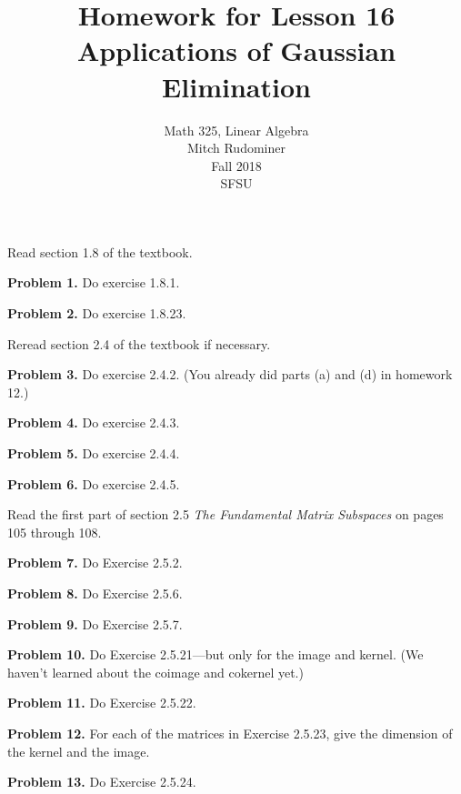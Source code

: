 \documentclass[oneside,12pt]{amsart}
\begin{document}
\title{Homework for Lesson 16 \\ Applications of Gaussian Elimination}
\author{Math 325, Linear Algebra \\ Mitch Rudominer \\ Fall 2018 \\ SFSU }
\date{}

\maketitle

\bigskip

Read section 1.8 of the textbook.

\bigskip

\textbf{Problem 1.} Do exercise 1.8.1.

\bigskip
\bigskip
\bigskip


\textbf{Problem 2.} Do exercise 1.8.23.

\bigskip
\bigskip
\bigskip

Reread section 2.4 of the textbook if necessary.

\bigskip

\textbf{Problem 3.} Do exercise 2.4.2. (You already did parts (a) and (d) in homework 12.)

\bigskip
\bigskip
\bigskip

\textbf{Problem 4.} Do exercise 2.4.3.

\bigskip
\bigskip
\bigskip

\textbf{Problem 5.} Do exercise 2.4.4.

\bigskip
\bigskip
\bigskip

\textbf{Problem 6.} Do exercise 2.4.5.

\bigskip
\bigskip
\bigskip

Read the first part of section 2.5 \emph{The Fundamental Matrix Subspaces}
on pages 105 through 108.

\bigskip

\textbf{Problem 7.} Do Exercise 2.5.2.

\bigskip
\bigskip
\bigskip

\textbf{Problem 8.} Do Exercise 2.5.6.

\bigskip
\bigskip
\bigskip

\textbf{Problem 9.} Do Exercise 2.5.7.

\bigskip
\bigskip
\bigskip

\textbf{Problem 10.} Do  Exercise 2.5.21---but only for the image and kernel.
(We haven't learned about the coimage and cokernel yet.)

\bigskip
\bigskip
\bigskip

\textbf{Problem 11.} Do Exercise 2.5.22.

\bigskip
\bigskip
\bigskip

\textbf{Problem 12.} For each of the matrices in Exercise 2.5.23, give the
dimension of the kernel and the image.

\bigskip
\bigskip
\bigskip

\textbf{Problem 13.} Do  Exercise 2.5.24.
\end{document}

